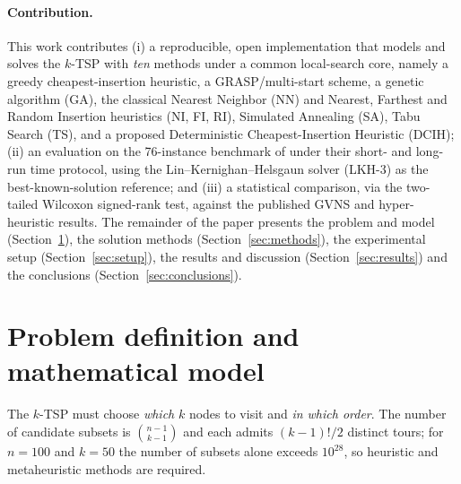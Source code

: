 \paragraph{Contribution.} This work contributes (i) a reproducible, open
implementation that models and solves the $k$-TSP with \emph{ten} methods under a
common local-search core, namely a greedy cheapest-insertion heuristic, a
GRASP/multi-start scheme, a genetic algorithm (GA), the classical Nearest Neighbor
(NN) and Nearest, Farthest and Random Insertion heuristics (NI, FI, RI), Simulated
Annealing (SA), Tabu Search (TS), and a proposed Deterministic Cheapest-Insertion
Heuristic (DCIH); (ii) an evaluation on the 76-instance benchmark of
\citet{pandiri2020} under their short- and long-run time protocol, using the
Lin--Kernighan--Helsgaun solver (LKH-3) as the best-known-solution reference; and
(iii) a statistical comparison, via the two-tailed Wilcoxon signed-rank test,
against the published GVNS and hyper-heuristic results. The remainder of the paper
presents the problem and model (Section~\ref{sec:model}), the solution methods
(Section~\ref{sec:methods}), the experimental setup (Section~\ref{sec:setup}), the
results and discussion (Section~\ref{sec:results}) and the conclusions
(Section~\ref{sec:conclusions}).

\section{Problem definition and mathematical model}\label{sec:model}

The $k$-TSP must choose \emph{which} $k$ nodes to visit and \emph{in which order}.
The number of candidate subsets is $\binom{n-1}{k-1}$ and each admits $(k-1)!/2$
distinct tours; for $n=100$ and $k=50$ the number of subsets alone exceeds
$10^{28}$, so heuristic and metaheuristic methods are required.

